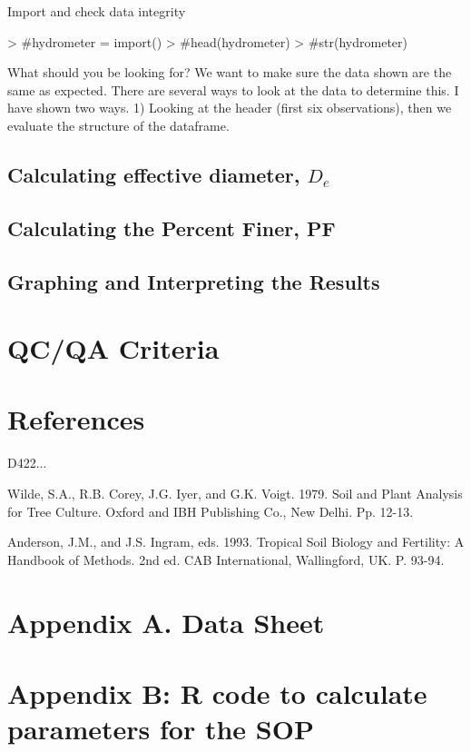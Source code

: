 \documentclass[12pt]{../SOP3_alpha}
\begin{document}
Import and check data integrity

\begin{Schunk}
\begin{Sinput}
> #hydrometer = import()
> #head(hydrometer)
> #str(hydrometer)
\end{Sinput}
\end{Schunk}

What should you be looking for?  We want to make sure the data shown are the same as expected. There are several ways to look at the data to determine this. I have shown two ways. 1) Looking at the header (first six observations), then we evaluate the structure of the dataframe.
 
\subsection{Calculating effective diameter, $D_e$}


\subsection{Calculating the Percent Finer, PF}


\subsection{Graphing and Interpreting the Results}

\section{QC/QA Criteria}

\section{References}

\NP D422...

\NP Wilde, S.A., R.B. Corey, J.G. Iyer, and G.K. Voigt.  1979.  Soil and Plant Analysis for Tree Culture.  Oxford and IBH Publishing Co., New Delhi.  Pp. 12-13.

\NP Anderson, J.M., and J.S. Ingram, eds.  1993.  Tropical Soil Biology and Fertility:  A Handbook of Methods. 2nd ed.  CAB International, Wallingford, UK.  P. 93-94.

\section{Appendix A. Data Sheet}




\newpage
\section{Appendix B: R code to calculate parameters for the SOP}

% 	
\end{document}
